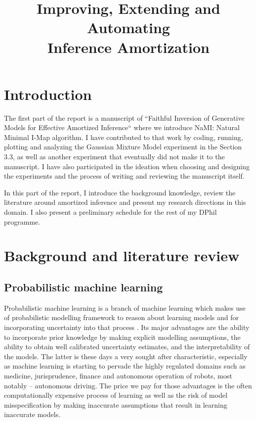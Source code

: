 \documentclass[12pt]{article}
\begin{document}




\title{Improving, Extending and Automating\\Inference Amortization}
\date{}
\maketitle

\vspace{-50pt}


\section{Introduction}
The first part of the report is a manuscript of ``Faithful Inversion of Generative Models for Effective Amortized Inference`` where we introduce NaMI: Natural Minimal I-Map algorithm.
I have contributed to that work by coding, running, plotting and analyzing the Gaussian Mixture Model experiment in the Section 3.3, as well as another experiment that eventually did not make it to the manuscript. 
I have also participated in the ideation when choosing and designing the experiments and the process of writing and reviewing the manuscript itself.

In this part of the report, I introduce the background knowledge, review the literature around amortized inference and 
present my research directions in this domain. 
I also present a preliminary schedule for the rest of my DPhil programme.




\section{Background and literature review}

\subsection{Probabilistic machine learning}
Probabilistic machine learning is a branch of machine learning which makes use of probabilistic modelling framework to reason about learning models and for incorporating uncertainty into that process \citep{Ghahramani2015}.
Its major advantages are the ability to incorporate prior knowledge by making explicit modelling assumptions, the ability to obtain well calibrated uncertainty estimates, and the interpretability of the models.
The latter is these days a very sought after characteristic, especially as machine learning is starting to pervade the highly regulated domains such as medicine, jurisprudence, finance and autonomous operation of robots, most notably -- autonomous driving.
The price we pay for those advantages is the often computationally expensive process of learning as well as the risk of model misspecification by making inaccurate assumptions that result in learning inaccurate models.
\end{document}
